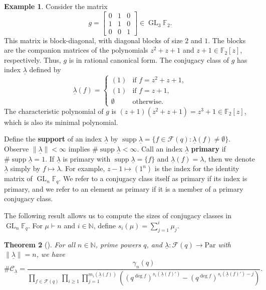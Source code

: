 \documentclass[10pt]{article}
\newtheorem{theorem}{Theorem}[section]
\theoremstyle{definition}
\newtheorem{example}[theorem]{Example}
\DeclareMathOperator{\GL}{GL}
\DeclareMathOperator{\supp}{supp}
\newcommand{\CC}{\mathcal{C}}
\newcommand{\F}{\mathbb{F}}
\newcommand{\CF}{\mathcal{F}}
\newcommand{\N}{\mathbb{N}}
\newcommand{\myemph}{\textbf}
\newcommand{\Par}{\text{Par}}
\newcommand{\ulambda}{{\underline{\lambda}}}
\begin{document}
\begin{example}
Consider the matrix
$$ g = \begin{bmatrix}
0 & 1 & 0 \\
1 & 1 & 0 \\
0 & 0 & 1
\end{bmatrix} \in \GL_3 \F_2. $$
This matrix is block-diagonal, with diagonal blocks of size $2$ and $1$. The blocks are the companion matrices of the polynomials $z^2+z+1$ and $z+1 \in \F_2[z]$, respectively.
Thus, $g$ is in rational canonical form. The conjugacy class of $g$ has index $\ulambda$ defined by
$$ \ulambda (f) = \begin{cases}
(1) & \text{if } f = z^2 + z + 1, \\
(1) & \text{if } f = z+1, \\
\emptyset & \text{otherwise.}
\end{cases} $$
The characteristic polynomial of $g$ is $(z+1)(z^2+z+1) = z^3+1 \in \F_2 [z]$, which is also its minimal polynomial.
\end{example}



Define the \myemph{support} of an index $\ulambda$ by $\supp \ulambda = \{f \in \CF (q) : \ulambda (f) \neq \emptyset\}$. Observe $\| \ulambda \| < \infty$ implies $\# \supp \ulambda  < \infty$. Call an index $\ulambda$ \myemph{primary} if $\# \supp \ulambda = 1$.
If $\ulambda$ is primary with $\supp \ulambda = \{f\}$ and $\ulambda (f) = \lambda$, then we denote $\ulambda$ simply by $f \mapsto \lambda$. For example, $z-1 \mapsto (1^n)$ is the index for the identity matrix of $\GL_n \F_q$.
We refer to a conjugacy class itself as primary if its index is primary, and we refer to an element as primary if it is a member of a primary conjugacy class.

The following result allows us to compute the sizes of conjugacy classes in \(\GL_n \F_q\).
For \(\mu \vdash n\) and \(i \in \N\), define \(s_i(\mu) = \sum_{j=1}^i \mu_j\).

\begin{theorem}[{\cite[Theorem~1.10.7]{EC1}}]
\label{cc_sizes}
For all \(n \in \N\), prime powers \(q\), and \(\ulambda : \CF (q) \to \Par\) with \(\|\ulambda \| = n\), we have
\begin{equation}
\# \CC_\ulambda
=
\frac{\gamma_n(q)}{
\prod_{f \in \CF (q)}
\prod_{i \geq 1}
\prod_{j = 1}^{m_i(\ulambda(f))}
\left (
(q^{\deg f})^{s_i(\ulambda(f)')}
-
(q^{\deg f})^{s_i(\ulambda(f)') - j}
\right ) }.
\end{equation}
\end{theorem}
\end{document}
